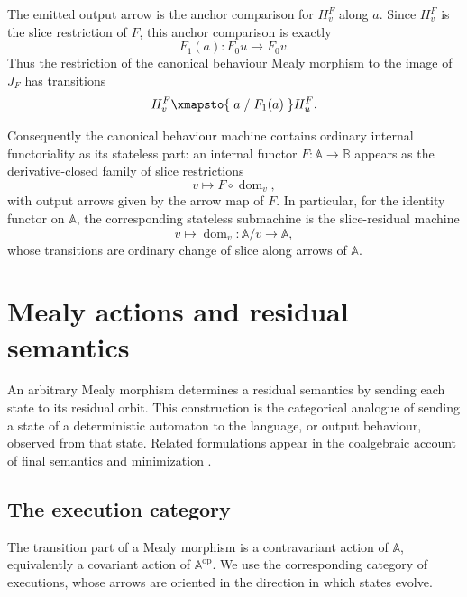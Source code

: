The emitted output arrow is the anchor comparison for \(H^F_v\) along \(a\). Since \(H^F_v\) is the slice restriction of \(F\), this anchor comparison is exactly
\[
    F_1(a):F_0u\to F_0v.
\]
Thus the restriction of the canonical behaviour Mealy morphism to the image of \(J_F\) has transitions
\[
    H^F_v
        \xmapsto{\;a\;/\;F_1(a)\;}
    H^F_u.
\]

Consequently the canonical behaviour machine contains ordinary internal functoriality as its stateless part: an internal functor \(F:\mathbb A\to\mathbb B\) appears as the derivative-closed family of slice restrictions
\[
    v\longmapsto F\circ\operatorname{dom}_v,
\]
with output arrows given by the arrow map of \(F\). In particular, for the identity functor on \(\mathbb A\), the corresponding stateless submachine is the slice-residual machine
\[
    v\longmapsto \operatorname{dom}_v:\mathbb A/v\to\mathbb A,
\]
whose transitions are ordinary change of slice along arrows of \(\mathbb A\).

\section{Mealy actions and residual semantics}
\label{sec:mealy-actions-residual-semantics}

An arbitrary Mealy morphism determines a residual semantics by sending each state to its residual orbit. This construction is the categorical analogue of sending a state of a deterministic automaton to the language, or output behaviour, observed from that state. Related formulations appear in the coalgebraic account of final semantics and minimization \cite{Rutten1998,Rutten2000}.

\subsection{The execution category}
\label{subsec:execution-category}

The transition part of a Mealy morphism is a contravariant action of \(\mathbb A\), equivalently a covariant action of \(\mathbb A^{\mathrm{op}}\). We use the corresponding category of executions, whose arrows are oriented in the direction in which states evolve.

